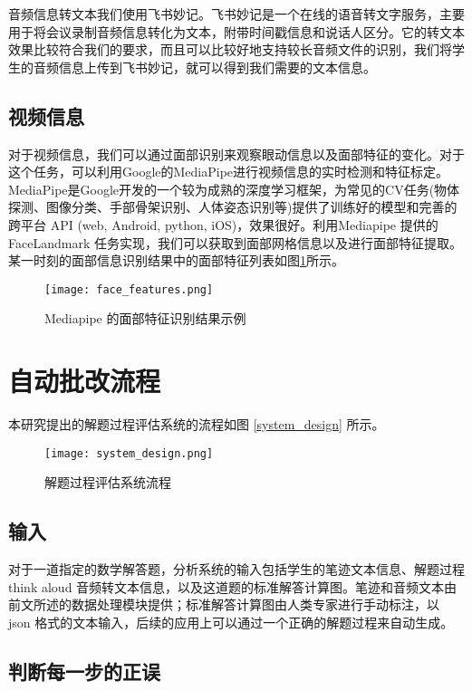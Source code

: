 音频信息转文本我们使用飞书妙记。飞书妙记是一个在线的语音转文字服务，主要用于将会议录制音频信息转化为文本，附带时间戳信息和说话人区分。它的转文本效果比较符合我们的要求，而且可以比较好地支持较长音频文件的识别，我们将学生的音频信息上传到飞书妙记，就可以得到我们需要的文本信息。

\subsection*{视频信息}

对于视频信息，我们可以通过面部识别来观察眼动信息以及面部特征的变化。对于这个任务，可以利用Google的MediaPipe进行视频信息的实时检测和特征标定。MediaPipe是Google开发的一个较为成熟的深度学习框架，为常见的CV任务(物体探测、图像分类、手部骨架识别、人体姿态识别等)提供了训练好的模型和完善的跨平台 API (web, Android, python, iOS)，效果很好。利用Mediapipe 提供的 FaceLandmark 任务实现，我们可以获取到面部网格信息以及进行面部特征提取。某一时刻的面部信息识别结果中的面部特征列表如图\ref{fig:face_features}所示。

\begin{figure}
    \centering
    \texttt{[image: face\_features.png]}
    \caption{Mediapipe 的面部特征识别结果示例}
    \label{fig:face_features}
\end{figure}

\section{自动批改流程}

本研究提出的解题过程评估系统的流程如图 \ref{system_design} 所示。

\begin{figure}
    \centering
    \texttt{[image: system\_design.png]}
    \caption{解题过程评估系统流程}
    \label{fig:system_design}
\end{figure}

\subsection*{输入}

对于一道指定的数学解答题，分析系统的输入包括学生的笔迹文本信息、解题过程 think aloud 音频转文本信息，以及这道题的标准解答计算图。笔迹和音频文本由前文所述的数据处理模块提供；标准解答计算图由人类专家进行手动标注，以 json 格式的文本输入，后续的应用上可以通过一个正确的解题过程来自动生成。

\subsection*{判断每一步的正误}

